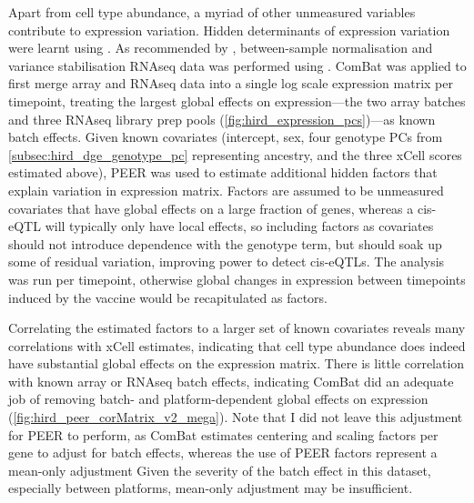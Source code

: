 %
%
Apart from cell type abundance, a myriad of other unmeasured variables contribute to expression variation.
Hidden determinants of expression variation were learnt using \autocite{stegle2012UsingProbabilisticEstimation}.
As recommended by \autocite{stegle2012UsingProbabilisticEstimation}, between-sample normalisation and variance stabilisation \gls{RNAseq} data was performed using .
ComBat was applied to first merge array and \gls{RNAseq} data into a single log scale expression matrix per timepoint, treating the largest global effects on expression---the two array batches and three \gls{RNAseq} library prep pools (\autoref{fig:hird_expression_pcs})---as known batch effects.
Given known covariates (intercept, sex, four genotype \glspl{PC} from \autoref{subsec:hird_dge_genotype_pc} representing ancestry, and the three xCell scores estimated above),
PEER was used to estimate additional hidden factors that explain variation in expression matrix.
Factors are assumed to be unmeasured covariates that have global effects on a large fraction of genes, 
whereas a cis-\gls{eQTL} will typically only have local effects, so including factors as covariates should not introduce dependence with the genotype term,
but should soak up some of residual variation, improving power to detect cis-\glspl{eQTL}.
The analysis was run per timepoint, otherwise global changes in expression between timepoints induced by the vaccine would be recapitulated as factors.

Correlating the estimated factors to a larger set of known covariates reveals many correlations with xCell estimates, indicating that cell type abundance does indeed have substantial global effects on the expression matrix.
There is little correlation with known array or \gls{RNAseq} batch effects, indicating ComBat did an adequate job of removing batch- and platform-dependent global effects on expression (\autoref{fig:hird_peer_corMatrix_v2_mega}).
Note that I did not leave this adjustment for PEER to perform, as ComBat estimates centering and scaling factors per gene to adjust for batch effects, whereas the use of PEER factors represent a mean-only adjustment
Given the severity of the batch effect in this dataset, especially between platforms, mean-only adjustment may be insufficient\autocite{zhang2018AlternativeEmpiricalBayes}.

